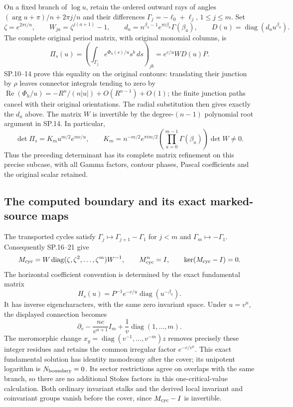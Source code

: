 \documentclass[11pt]{article}
\begin{document}
On a fixed branch of \(\log u\), retain the ordered outward rays of
angles \((\arg u+\pi)/n+2\pi j/n\) and their differences
\(\Gamma_j=-\ell_0+\ell_j\), \(1\leq j\leq m\).
Set
\[
 \zeta=e^{2\pi i/n},\qquad
 W_{ja}=\zeta^{j(a+1)}-1,\qquad
 d_a=n^{\beta_a-1}e^{\pi i\beta_a}\Gamma(\beta_a),\qquad
 D(u)=\operatorname{diag}(d_a u^{\beta_a}).
\]
The complete original period matrix, with original monomial columns,
is
\[
 \Pi_s(u)=\left(\int_{\Gamma_j}e^{\Phi_h(s)/u}s^b\,ds\right)_{jb}
         =e^{c/u}W D(u)P .
\]
SP.10--14 prove this equality on the original contours: translating
their junction by \(\rho\) leaves connector integrals tending to zero
by
\(\operatorname{Re}(\Phi_h/u)
=-R^n/(n|u|)+O(R^{n-1})+O(1)\); the finite junction paths cancel with
their original orientations.  The radial substitution then gives
exactly the \(d_a\) above.  The matrix \(W\) is invertible by the
degree-\((n-1)\) polynomial root argument in SP.14.  In particular,
\[
 \det\Pi_s
 =K_m u^{m/2}e^{mc/u},\qquad
 K_m=n^{-m/2}e^{\pi im/2}
       \left(\prod_{a=0}^{m-1}\Gamma(\beta_a)\right)\det W\ne0 .
\]
Thus the preceding determinant has its complete matrix refinement
on this precise subcase, with all Gamma factors, contour phases,
Pascal coefficients and the original scalar retained.

\subsection{The computed boundary and its exact marked-source maps}

The transported cycles satisfy
\(\Gamma_j\mapsto\Gamma_{j+1}-\Gamma_1\) for \(j<m\) and
\(\Gamma_m\mapsto-\Gamma_1\).  Consequently SP.16--21 give
\[
 M_{\rm cyc}
 =W\operatorname{diag}(\zeta,\zeta^2,\ldots,\zeta^m)W^{-1},
 \qquad M_{\rm cyc}^n=I,\qquad
 \ker(M_{\rm cyc}-I)=0 .
\]
The horizontal coefficient convention is determined by the exact
fundamental matrix
\[
 H_s(u)=P^{-1}e^{-c/u}\operatorname{diag}(u^{-\beta_a}).
\]
It has inverse eigencharacters, with the same zero invariant space.
Under \(u=v^n\), the displayed connection becomes
\[
 \partial_v-\frac{nc}{v^{n+1}}I_m
     +\frac1v\operatorname{diag}(1,\ldots,m).
\]
The meromorphic change
\(x_y=\operatorname{diag}(v^{-1},\ldots,v^{-m})z\)
removes precisely these integer residues and retains the common
irregular factor \(e^{-c/v^n}\).  This exact fundamental solution
has identity monodromy after the cover; its unipotent logarithm is
\(N_{\rm boundary}=0\).  Its sector restrictions agree on overlaps
with the same branch, so there are no additional Stokes factors in
this one-critical-value calculation.  Both ordinary invariant
stalks and the derived local invariant and coinvariant groups vanish
before the cover, since \(M_{\rm cyc}-I\) is invertible.
\end{document}
